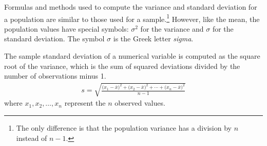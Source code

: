 \begin{doublespace}
Formulas and methods used to compute the variance and standard deviation for a population are similar to those used for a sample.\footnote{The only difference is that the population variance has a division by $n$ instead of $n-1$.} However, like the mean, the population values have special symbols: $\sigma_{}^2$ for the variance and $\sigma$ for the standard deviation. The symbol $\sigma$  is the Greek letter \emph{sigma}.

\begin{termBox}{
		The sample standard deviation of a numerical variable is computed as the square root of the variance, which is the sum of squared deviations divided by the number of observations minus 1.
		\begin{eqnarray}
		s = \sqrt{\frac{({x_1 - \overline{x})}^{2}+({x_2 - \overline{x})}^{2}+\cdots+({x_n - \overline{x})}^{2}}{n-1}}
		\label{SDEquation}
		\end{eqnarray}
		where $x_1, x_2, \dots, x_n$ represent the $n$ observed values.}
\end{termBox}


\end{doublespace}

